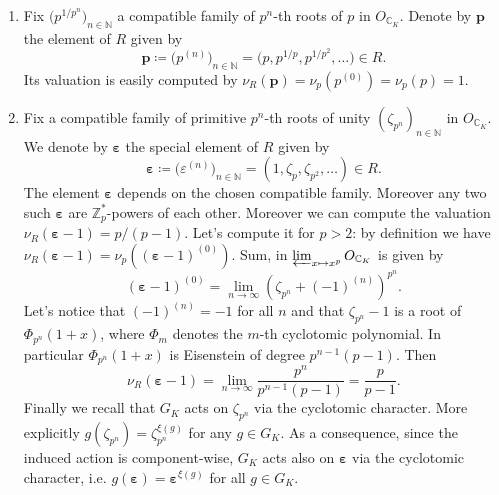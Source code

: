 \begin{ntt}[]\leavevmode\vspace{-.2\baselineskip}\label{not:ExampleEltsTilt}
\begin{enumerate}
\item Fix $\big( p^{1/p^n} \big)_{n \in \mathbb{N}}$ 
	a compatible family of $p^n$-th roots of $p$
	in $O_{\mathbb{C}_K}$.
	Denote by $\mathbf{p}$ the element of $R$ given by
	\begin{equation*}
		\mathbf{p} \coloneqq \big( p^{(n)} \big)_{n \in \mathbb{N}} =
		\big( p, p^{1/p}, p^{1/p^2}, \ldots \big) \in R
	.\end{equation*}
	Its valuation is easily computed by
	$\nu_R(\mathbf{p}) = \nu_p(p^{(0)}) = \nu_p(p) = 1$.

\item Fix a compatible family of primitive $p^n$-th roots of unity
	$\left( \zeta_{p^n} \right)_{n \in \mathbb{N}}$ in $O_{\mathbb{C}_K}$.
	We denote by $\boldsymbol\varepsilon$ the special element of $R$ given by
	\begin{equation*}
		\boldsymbol\varepsilon \coloneqq \big( \varepsilon^{(n)} \big)_{n \in \mathbb{N}} =
		\left( 1, \zeta_p, \zeta_{p^2}, \ldots \right) \in R
	.\end{equation*}
	The element $\boldsymbol\varepsilon$ depends on the chosen
	compatible family.
	Moreover any two such $\boldsymbol\varepsilon$
	are $\mathbb{Z}_{p}^*$-powers of each other.
	Moreover we can compute the valuation
	$\nu_R \left( \boldsymbol\varepsilon - 1 \right) = p/ (p - 1)$.
	Let's compute it for $p > 2$: by definition we have
	$\nu_R(\boldsymbol\varepsilon - 1) = \nu_p \left( (\boldsymbol\varepsilon -1 )^{(0)} \right)$.
	Sum, in $\varprojlim_{x \mapsto x^p} O_{\mathbb{C}_K}$
	is given by
	\begin{equation*}
		\left( \boldsymbol\varepsilon -1 \right)^{(0)} =
		\lim_{n \to \infty} \left( \zeta_{p^n} + (-1)^{(n)} \right)^{p^n}
	.\end{equation*}
	Let's notice that $\left( -1 \right)^{(n)} = -1$ for all $n$
	and that $\zeta_{p^n} - 1$ is a root of $\Phi_{p^n}(1+x)$,
	where $\Phi_m$ denotes the $m$-th cyclotomic polynomial.
	In particular $\Phi_{p^n}(1+x)$ is Eisenstein of degree
	$p^{n-1}(p-1)$.
	Then
	\begin{equation*}
		\nu_R(\boldsymbol\varepsilon - 1) =
		\lim_{n \to \infty} \frac{ p^n }{ p^{n-1}(p-1) } =
		\frac{ p }{ p-1 }
	.\end{equation*}
	Finally we recall that $G_K$ acts on $\zeta_{p^n}$ via
	the cyclotomic character.
	More explicitly $g(\zeta_{p^n}) = \zeta_{p^n}^{\xi(g)}$ for any $g \in G_K$.
	As a consequence, since the induced action is component-wise,
	$G_K$ acts also on $\boldsymbol\varepsilon$ via the cyclotomic character,
	i.e. $g(\boldsymbol\varepsilon) = \boldsymbol\varepsilon^{\xi(g)}$
	for all $g \in G_K$.
\end{enumerate}
\end{ntt}


